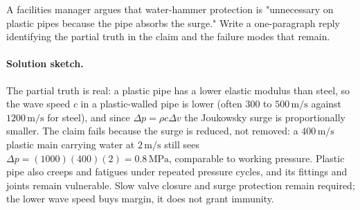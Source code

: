\begin{exercise}
A facilities manager argues that water-hammer protection is
"unnecessary on plastic pipes because the pipe absorbs the surge."
Write a one-paragraph reply identifying the partial truth in the
claim and the failure modes that remain.

\paragraph{Solution sketch.} The partial truth is real: a plastic pipe
has a lower elastic modulus than steel, so the wave speed $c$ in a
plastic-walled pipe is lower (often $300$ to $500\,\text{m}/\text{s}$
against $1200\,\text{m}/\text{s}$ for steel), and since $\Delta p = \rho c
\Delta v$ the Joukowsky surge is proportionally smaller. The claim fails
because the surge is reduced, not removed: a $400\,\text{m}/\text{s}$
plastic main carrying water at $2\,\text{m}/\text{s}$ still sees
$\Delta p = (1000)(400)(2) = 0.8\,\text{MPa}$, comparable to working
pressure. Plastic pipe also creeps and fatigues under repeated pressure
cycles, and its fittings and joints remain vulnerable. Slow valve
closure and surge protection remain required; the lower wave speed buys
margin, it does not grant immunity.
\end{exercise}
